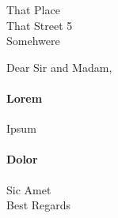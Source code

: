 \documentclass[nocolors,noadress]{friggeri-txt}
\begin{document}

\begin{letter}{ %
That Place \\
That Street 5 \\
Somehwere}

\opening{Dear Sir and Madam,}
\paragraph{Lorem }{Ipsum}

\paragraph{Dolor }{Sic Amet}\\

Best Regards\\
\vspace*{-40pt}
\end{letter}
\end{document}
